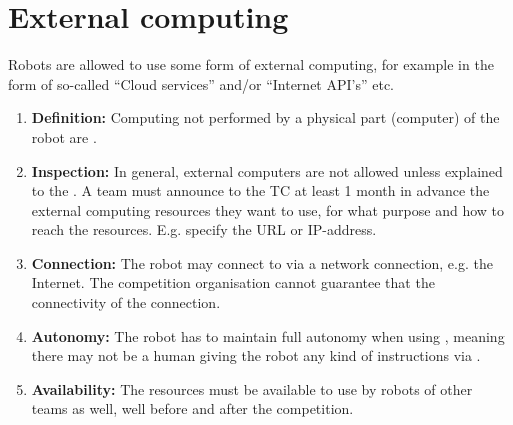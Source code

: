 \section{External computing}\label{rule:robot_external_computing}
Robots are allowed to use some form of external computing, for example in the form of so-called ``Cloud services'' and/or ``Internet API's'' etc. 
\begin{enumerate}
	\item \textbf{Definition:} Computing not performed by a physical part (computer) of the robot are . 
	\item \textbf{Inspection:} In general, external computers are not allowed unless explained to the .
	  A team must announce to the TC at least 1 month in advance the external computing resources they want to use, for what purpose and how to reach the resources.
	  E.g. specify the URL or IP-address. 
	\item \textbf{Connection:} The robot may connect to  via a network connection, e.g. the Internet. 
	  The competition organisation cannot guarantee that the connectivity of the connection. 
	\item \textbf{Autonomy:} The robot has to maintain full autonomy when using , 
	  meaning there may not be a human giving the robot any kind of instructions via .
	\item \textbf{Availability:} The resources must be available to use by robots of other teams as well, well before and after the competition. 
\end{enumerate}


 

